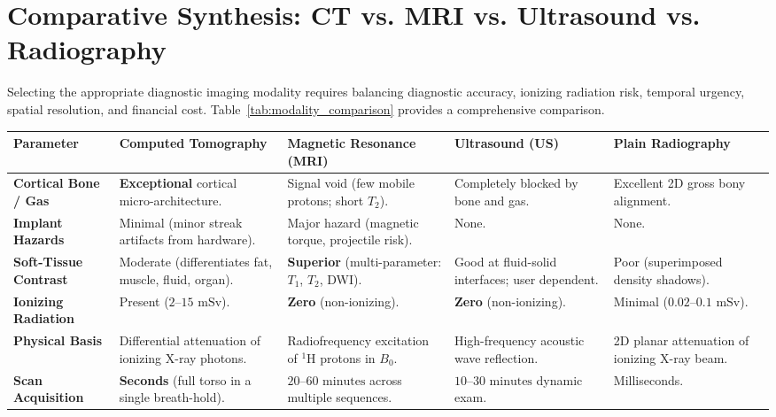 \documentclass[11pt,a4paper]{article}
\begin{document}
\section{Comparative Synthesis: CT vs. MRI vs. Ultrasound vs. Radiography}

Selecting the appropriate diagnostic imaging modality requires balancing diagnostic accuracy, ionizing radiation risk, temporal urgency, spatial resolution, and financial cost. Table~\ref{tab:modality_comparison} provides a comprehensive comparison.

\begin{table}[htbp]
\centering
\small
\setlength{\tabcolsep}{3pt}
\renewcommand{\arraystretch}{1.25}
\begin{tabular}{p{2.2cm}p{3.2cm}p{3.2cm}p{3.0cm}p{2.8cm}}
\toprule
\textbf{Parameter} & \textbf{Computed Tomography} & \textbf{Magnetic Resonance (MRI)} & \textbf{Ultrasound (US)} & \textbf{Plain Radiography} \\
\midrule
\textbf{Cortical Bone / Gas} & \textbf{Exceptional} cortical micro-architecture. & Signal void (few mobile protons; short $T_2$). & Completely blocked by bone and gas. & Excellent 2D gross bony alignment. \\
\textbf{Implant Hazards} & Minimal (minor streak artifacts from hardware). & Major hazard (magnetic torque, projectile risk). & None. & None. \\
\textbf{Soft-Tissue Contrast} & Moderate (differentiates fat, muscle, fluid, organ). & \textbf{Superior} (multi-parameter: $T_1$, $T_2$, DWI). & Good at fluid-solid interfaces; user dependent. & Poor (superimposed density shadows). \\
\textbf{Ionizing Radiation} & Present ($2\text{--}15\text{ mSv}$). & \textbf{Zero} (non-ionizing). & \textbf{Zero} (non-ionizing). & Minimal ($0.02\text{--}0.1\text{ mSv}$). \\
\textbf{Physical Basis} & Differential attenuation of ionizing X-ray photons. & Radiofrequency excitation of $^1\text{H}$ protons in $B_0$. & High-frequency acoustic wave reflection. & 2D planar attenuation of ionizing X-ray beam. \\
\textbf{Scan Acquisition} & \textbf{Seconds} (full torso in a single breath-hold). & $20\text{--}60\text{ minutes}$ across multiple sequences. & $10\text{--}30\text{ minutes}$ dynamic exam. & Milliseconds. \\

\end{tabular}
\end{table}
\end{document}
